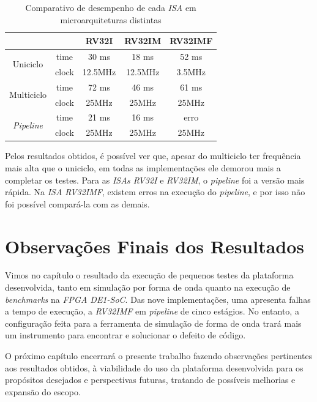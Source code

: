     \begin{longtable}{cc|c|c|c|}
        \caption{Comparativo de desempenho de cada \textit{ISA} em microarquiteturas distintas}\label{table:benchmark}\\
        \cline{3-5}
                                                                &                               & RV32I       & RV32IM      & RV32IMF   \\
        \hline
        \endfirsthead
        \endhead
        \multicolumn{1}{|c}{\multirow{2}{*}{{Uniciclo}}}        & \multicolumn{1}{|c|}{time}    & 30 ms       & 18 ms       & 52 ms \\
        \cline{2-5}
        \multicolumn{1}{|c}{ }                                  & \multicolumn{1}{|c|}{clock}   & 12.5MHz     & 12.5MHz     & 3.5MHz \\
        \hline
        \multicolumn{1}{|c}{\multirow{2}{*}{{Multiciclo}}}      & \multicolumn{1}{|c|}{time}    & 72 ms       & 46 ms       & 61 ms \\
        \cline{2-5}
        \multicolumn{1}{|c}{ }                                  & \multicolumn{1}{|c|}{clock}   & 25MHz       & 25MHz       & 25MHz \\
        \hline
        \multicolumn{1}{|c}{\multirow{2}{*}{\textit{Pipeline}}} & \multicolumn{1}{|c|}{time}    & 21 ms       & 16 ms       & erro \\
        \cline{2-5}
        \multicolumn{1}{|c}{ }                                  & \multicolumn{1}{|c|}{clock}   & 25MHz       & 25MHz       & 25MHz \\
        \hline
    \end{longtable}

    { Pelos resultados obtidos, é possível ver que, apesar do multiciclo ter
        frequência mais alta que o uniciclo, em todas as implementações ele demorou
        mais a completar os testes. Para as \textit{ISAs RV32I} e \textit{RV32IM},
        o \textit{pipeline} foi a versão mais rápida. Na \textit{ISA RV32IMF},
        existem erros na execução do \textit{pipeline}, e por isso não foi possível
        compará-la com as demais.
    }

\section{Observações Finais dos Resultados}
    { Vimos no capítulo o resultado da execução de pequenos testes da plataforma
        desenvolvida, tanto em simulação por forma de onda quanto na execução de
        \textit{benchmarks} na \textit{FPGA DE1-SoC}. Das nove implementações,
        uma apresenta falhas a tempo de execução, a \textit{RV32IMF} em
        \textit{pipeline} de cinco estágios. No entanto, a configuração feita para
        a ferramenta de simulação de forma de onda trará mais um instrumento para
        encontrar e solucionar o defeito de código.
    }

    { O próximo capítulo encerrará o presente trabalho fazendo observações
        pertinentes aos resultados obtidos, à viabilidade do uso da plataforma
        desenvolvida para os propósitos desejados e perspectivas futuras,
        tratando de possíveis melhorias e expansão do escopo.
    }

